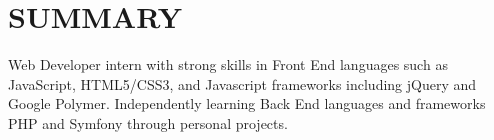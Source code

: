 \documentclass[]{deedy-resume-openfont}
\begin{document}
%
%

%
%



\vspace{5mm}

%
%

\section{SUMMARY}
\begin{flushleft}
Web Developer intern with strong skills in Front End languages such as JavaScript, HTML5/CSS3, and Javascript frameworks including jQuery and Google Polymer. Independently learning Back End languages and frameworks PHP and Symfony through personal projects. 
\end{flushleft}
\end{document}
